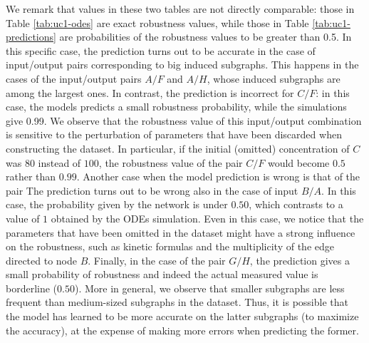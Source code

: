 We remark that values in these two tables are not directly comparable: those in Table \ref{tab:uc1-odes} are exact robustness values, while those in Table \ref{tab:uc1-predictions} are probabilities of the robustness values to be greater than 0.5. In this specific case, the prediction turns out to be accurate in the case of input/output pairs corresponding to big induced subgraphs. This happens in the cases of the input/output pairs $A/F$ and $A/H$, whose induced subgraphs are among the largest ones. In contrast, the prediction is incorrect for $C/F$: in this case, the models predicts a small robustness probability, while the simulations give 0.99. We observe that the robustness value of this input/output combination is sensitive to the perturbation of parameters that have been discarded when constructing the dataset. In particular, if the initial (omitted) concentration of $C$ was $80$ instead of $100$, the robustness value of the pair $C/F$ would become $0.5$ rather than $0.99$. Another case when the model prediction is wrong is that of the pair The prediction turns out to be wrong also in the case of input $B/A$. In this case, the probability given by the network is under $0.50$, which contrasts to a value of $1$ obtained by the ODEs simulation. Even in this case, we notice that the parameters that have been omitted in the dataset might have a strong influence on the robustness, such as kinetic formulas and the multiplicity of the edge directed to node $B$. Finally, in the case of the pair $G/H$, the prediction gives a small probability of robustness and indeed the actual measured value is borderline ($0.50$). More in general, we observe that smaller subgraphs are less frequent than medium-sized subgraphs in the dataset. Thus, it is possible that the model has learned to be more accurate on the latter subgraphs (to maximize the accuracy), at the expense of making more errors when predicting the former.

